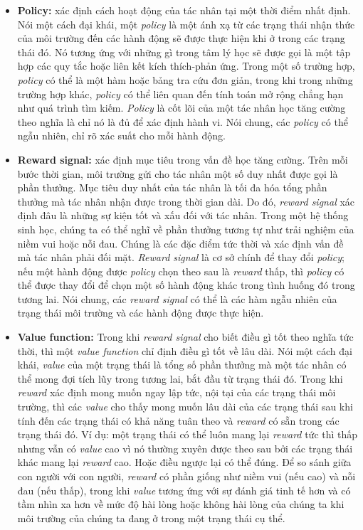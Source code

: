 \begin{itemize}
    \item \textbf{Policy:} xác định cách hoạt động của tác nhân tại một thời điểm nhất định. Nói một cách đại khái, một \textit{policy} là một ánh xạ từ các trạng thái nhận thức của môi trường đến các hành động sẽ được thực hiện khi ở trong các trạng thái đó. Nó tương ứng với những gì trong tâm lý học sẽ được gọi là một tập hợp các quy tắc hoặc liên kết kích thích-phản ứng. Trong một số trường hợp, \textit{policy} có thể là một hàm hoặc bảng tra cứu đơn giản, trong khi trong những trường hợp khác, \textit{policy} có thể liên quan đến tính toán mở rộng chẳng hạn như quá trình tìm kiếm. \textit{Policy} là cốt lõi của một tác nhân học tăng cường theo nghĩa là chỉ nó là đủ để xác định hành vi. Nói chung, các \textit{policy} có thể ngẫu nhiên, chỉ rõ xác suất cho mỗi hành động.
    \item \textbf{Reward signal:} xác định mục tiêu trong vấn đề học tăng cường. Trên mỗi bước thời gian, môi trường gửi cho tác nhân một số duy nhất được gọi là phần thưởng. Mục tiêu duy nhất của tác nhân là tối đa hóa tổng phần thưởng mà tác nhân nhận được trong thời gian dài. Do đó, \textit{reward signal} xác định đâu là những sự kiện tốt và xấu đối với tác nhân. Trong một hệ thống sinh học, chúng ta có thể nghĩ về phần thưởng tương tự như trải nghiệm của niềm vui hoặc nỗi đau. Chúng là các đặc điểm tức thời và xác định vấn đề mà tác nhân phải đối mặt. \textit{Reward signal} là cơ sở chính để thay đổi \textit{policy}; nếu một hành động được \textit{policy} chọn theo sau là \textit{reward} thấp, thì \textit{policy} có thể được thay đổi để chọn một số hành động khác trong tình huống đó trong tương lai. Nói chung, các \textit{reward signal} có thể là các hàm ngẫu nhiên của trạng thái môi trường và các hành động được thực hiện.
    \item \textbf{Value function:} Trong khi \textit{reward signal} cho biết điều gì tốt theo nghĩa tức thời, thì một \textit{value function} chỉ định điều gì tốt về lâu dài. Nói một cách đại khái, \textit{value} của một trạng thái là tổng số phần thưởng mà một tác nhân có thể mong đợi tích lũy trong tương lai, bắt đầu từ trạng thái đó. Trong khi \textit{reward} xác định mong muốn ngay lập tức, nội tại của các trạng thái môi trường, thì các \textit{value} cho thấy mong muốn lâu dài của các trạng thái sau khi tính đến các trạng thái có khả năng tuân theo và \textit{reward} có sẵn trong các trạng thái đó. Ví dụ: một trạng thái có thể luôn mang lại \textit{reward} tức thì thấp nhưng vẫn có \textit{value} cao vì nó thường xuyên được theo sau bởi các trạng thái khác mang lại \textit{reward} cao. Hoặc điều ngược lại có thể đúng. Để so sánh giữa con người với con người, \textit{reward} có phần giống như niềm vui (nếu cao) và nỗi đau (nếu thấp), trong khi \textit{value} tương ứng với sự đánh giá tinh tế hơn và có tầm nhìn xa hơn về mức độ hài lòng hoặc không hài lòng của chúng ta khi môi trường của chúng ta đang ở trong một trạng thái cụ thể.

\end{itemize}
